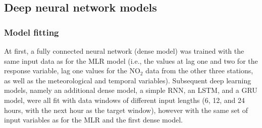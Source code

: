 



\subsection{Deep neural network models}

\subsubsection{Model fitting}
\label{sec:model_fitting}
At first, a fully connected neural network (dense model) was trained with the same input data as for the MLR model (i.e., the values at lag one and two for the response variable, lag one values for the NO$_2$ data from the other three stations, as well as the meteorological and temporal variables). Subsequent deep learning models, namely an additional dense model, a simple RNN, an LSTM, and a GRU model, were all fit with data windows of different input lengths (6, 12, and 24 hours, with the next hour as the target window), however with the same set of input variables as for the MLR and the first dense model. 

